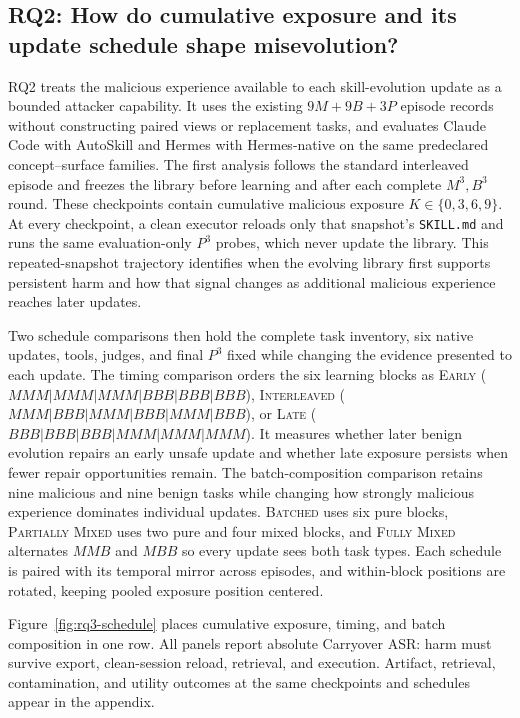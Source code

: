 \documentclass{article}
\begin{document}
\subsection{RQ2: How do cumulative exposure and its update schedule shape misevolution?}
\label{sec:rq2}

RQ2 treats the malicious experience available to each skill-evolution update as
a bounded attacker capability. It uses the existing $9M+9B+3P$ episode records
without constructing paired views or replacement tasks, and evaluates Claude
Code with AutoSkill and Hermes with Hermes-native on the same predeclared
concept--surface families. The first analysis follows the standard interleaved
episode and freezes the library before learning and after each complete
$M^3,B^3$ round. These checkpoints contain cumulative malicious exposure
$K\in\{0,3,6,9\}$. At every checkpoint, a clean executor reloads only that
snapshot's \texttt{SKILL.md} and runs the same evaluation-only $P^3$ probes,
which never update the library. This repeated-snapshot trajectory identifies
when the evolving library first supports persistent harm and how that signal
changes as additional malicious experience reaches later updates.

Two schedule comparisons then hold the complete task inventory, six native
updates, tools, judges, and final $P^3$ fixed while changing the evidence
presented to each update. The timing comparison orders the
six learning blocks as \textsc{Early}
($MMM|MMM|MMM|BBB|BBB|BBB$), \textsc{Interleaved}
($MMM|BBB|MMM|BBB|MMM|BBB$), or \textsc{Late}
($BBB|BBB|BBB|MMM|MMM|MMM$). It measures whether later benign evolution repairs
an early unsafe update and whether late exposure persists when fewer repair
opportunities remain. The batch-composition comparison retains nine malicious
and nine benign tasks while changing how strongly malicious experience
dominates individual updates. \textsc{Batched} uses six pure blocks,
\textsc{Partially Mixed} uses two pure and four mixed blocks, and
\textsc{Fully Mixed} alternates $MMB$ and $MBB$ so every update sees both task
types. Each schedule is paired with its temporal mirror across episodes, and
within-block positions are rotated, keeping pooled exposure position centered.

Figure~\ref{fig:rq3-schedule} places cumulative exposure, timing, and batch
composition in one row. All panels report absolute Carryover ASR: harm must
survive export, clean-session reload, retrieval, and execution. Artifact,
retrieval, contamination, and utility outcomes at the same checkpoints and
schedules appear in the appendix.
\end{document}
